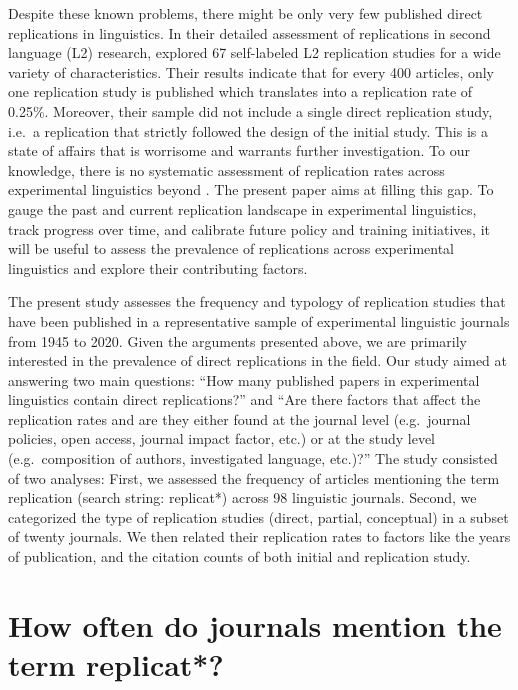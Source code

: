 \documentclass[cm,linguex]{glossa}
\begin{document}
Despite these known problems, there might be only very few published direct replications in linguistics. In their detailed assessment of replications in second language (L2) research, \citet{marsden_replication_2018} explored 67 self-labeled L2 replication studies for a wide variety of characteristics. Their results indicate that for every 400 articles, only one replication study is published which translates into a replication rate of 0.25\%. Moreover, their sample did not include a single direct replication study, i.e.~a replication that strictly followed the design of the initial study. This is a state of affairs that is worrisome and warrants further investigation. To our knowledge, there is no systematic assessment of replication rates across experimental linguistics beyond \citet{marsden_replication_2018}. The present paper aims at filling this gap. To gauge the past and current replication landscape in experimental linguistics, track progress over time, and calibrate future policy and training initiatives, it will be useful to assess the prevalence of replications across experimental linguistics and explore their contributing factors.

The present study assesses the frequency and typology of replication studies that have been published in a representative sample of experimental linguistic journals from 1945 to 2020.
Given the arguments presented above, we are primarily interested in the prevalence of direct replications in the field.
Our study aimed at answering two main questions: ``How many published papers in experimental linguistics contain direct replications?'' and ``Are there factors that affect the replication rates and are they either found at the journal level (e.g.~journal policies, open access, journal impact factor, etc.) or at the study level (e.g.~composition of authors, investigated language, etc.)?''
The study consisted of two analyses:
First, we assessed the frequency of articles mentioning the term replication (search string: replicat*) across 98 linguistic journals.
Second, we categorized the type of replication studies (direct, partial, conceptual) in a subset of twenty journals. We then related their replication rates to factors like the years of publication, and the citation counts of both initial and replication study.

\hypertarget{how-often-do-journals-mention-the-term-replicat}{%
\section{How often do journals mention the term replicat*?}\label{how-often-do-journals-mention-the-term-replicat}}
\end{document}
